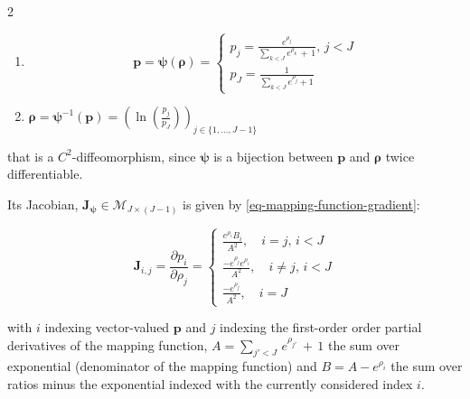 \documentclass[pdflatex, sn-nature]{sn-jnl}
\theoremstyle{thmstyleone}%
\theoremstyle{thmstyletwo}%
\theoremstyle{thmstylethree}%
\begin{document}
\begin{appendices}
        \begin{multicols}{2}
            \begin{enumerate}
                \item
                    \begin{equation}
                        \label{eq-mapping-function}\boldsymbol{p}= \boldsymbol{\psi}
                        (\boldsymbol{\rho}) =
                        \begin{cases}
                            p_{j} = \frac{e^{\rho_j}}{\sum_{k < J} e^{\rho_k} \, + \, 1}, \, j < J \\
                            p_{J} = \frac{1}{\sum_{k < J} e^{\rho_j} + 1}
                        \end{cases}
                    \end{equation}

                \item $\boldsymbol{\rho}= \boldsymbol{\psi}^{-1}(\boldsymbol{p}
                    ) = \left(\ln{\left( \frac{p_{j}}{p_{J}}\right)}\right)_{j
                    \in \{ 1, \ldots, J -1\}}$
            \end{enumerate}
        \end{multicols}
        that is a $C^{2}$-diffeomorphism, since $\boldsymbol{\psi}$ is a
        bijection between $\boldsymbol{p}$ and $\boldsymbol{\rho}$ twice
        differentiable.

        Its Jacobian, $\mathbf{J}_{\boldsymbol{\psi}}\in \mathcal{M}_{J \times (J-1)}$
        is given by \ref{eq-mapping-function-gradient}:

        \begin{equation}
            \label{eq-mapping-function-gradient}\mathbf{J}_{i,j}= \frac{\partial
            p_{i}}{\partial \rho_{j}}=
            \begin{cases}
                \frac{e^{\rho_i}B_{i}}{A^{2} },\quad i = j, \, i < J             \\
                \frac{-e^{\rho_j}e^{\rho_i}}{A^{2} }, \quad i \neq j, \, i < J \\
                \frac{-e^{\rho_j}}{A^{2}}, \quad i=J
            \end{cases}
        \end{equation}

        with $i$ indexing vector-valued $\boldsymbol{p}$ and $j$ indexing the
        first-order order partial derivatives of the mapping function, $A=\sum_{j'
        < J}\,e^{\rho_{j'}}\, + \, 1$ the sum over exponential (denominator of
        the mapping function) and $B=A - e^{\rho_{i}}$ the sum over ratios minus
        the exponential indexed with the currently considered index $i$.


\end{appendices}
\end{document}
